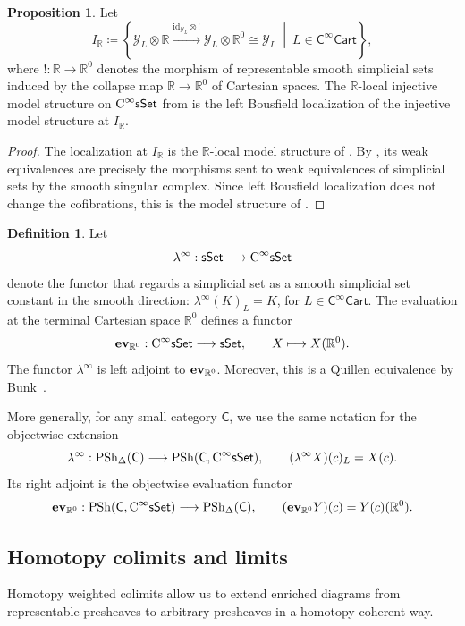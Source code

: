 \documentclass{amsart}
\newcommand{\cat}[1]{\mathsf{#1}}
\newcommand{\sset}{\cat{sSet}}
\newcommand{\id}{\mathrm{id}}
\newcommand{\CsSet}{\textnormal{C}^{\infty}\sset}
\newcommand{\Cart}{\cat{C}^{\infty}\cat{Cart}}
\renewcommand{\ev}{\textnormal{\textbf{ev}}}
\newcommand{\psh}{\mathrm{PSh}}
\newcommand{\spsh}{\mathrm{PSh}_{\Delta}}
\newcommand{\ra}{\rightarrow}
\newcommand{\RR}{{\mathbb{R}}}
\newcommand{\Yo}{\mathscr{Y}}
\theoremstyle{definition}
\newtheorem{definition}[equation]{Definition}
\newtheorem{proposition}[equation]{Proposition}
\numberwithin{equation}{subsection}
\numberwithin{subsubsection}{subsection}
\begin{document}
\begin{proposition}\label{prop:smooth.model.as.localization}
  Let
  \[
    I_{\RR}
    \coloneqq
    \left\{
      \Yo_L\otimes\RR
      \xrightarrow{\id_{\Yo_L}\otimes {!}}
      \Yo_L\otimes\RR^0
      \cong\Yo_L
      \ \middle|\ L\in\Cart
    \right\},
  \]
  where \({!}:\RR\ra\RR^0\) denotes the morphism of representable smooth
  simplicial sets induced by the collapse map \(\RR \ra \RR^0\) of Cartesian
  spaces.
  The \(\RR\)-local injective model structure on \(\CsSet\) from
   is the left
  Bousfield localization of the injective model structure at
  \(I_{\RR}\).
\end{proposition}

\begin{proof}
  The localization at \(I_{\RR}\) is the \(\RR\)-local model structure
  of \cite[Definition~2.5]{Bun22}. By
  \cite[Theorem~5.7]{Bun22}, its weak equivalences are precisely the
  morphisms sent to weak equivalences of simplicial sets by the smooth
  singular complex. Since left Bousfield localization does not change
  the cofibrations, this is the model structure of
  .
\end{proof}

\begin{definition}\label{def:constant.smooth.direction}
  Let
  \[
    \lambda^\infty:\sset\longrightarrow \CsSet
  \]
  denote the functor that regards a simplicial set as a smooth simplicial
  set constant in the smooth direction: \( \lambda^\infty(K)_L=K \), for
  \(L\in\Cart\).
  The evaluation at the terminal Cartesian space \( \RR^0 \) defines a functor
  \[
    \ev_{\RR^0}:\CsSet\longrightarrow\sset,
    \qquad
    X\longmapsto X(\RR^0).
  \]
  The functor \( \lambda^\infty \) is left adjoint to
  \( \ev_{\RR^0} \). Moreover, this is a Quillen equivalence by
  Bunk~\cite[Lemma~2.17]{Bun22}.

  More generally, for any small category \( \cat{C} \), we use the same
  notation for the objectwise extension
  \[
    \lambda^\infty:
    \spsh(\cat{C})
    \longrightarrow
    \psh(\cat{C},\CsSet),
    \qquad
    (\lambda^\infty X)(c)_L=X(c).
  \]
  Its right adjoint is the objectwise evaluation functor
  \[
    \ev_{\RR^0}:
    \psh(\cat{C},\CsSet)
    \longrightarrow
    \spsh(\cat{C}),
    \qquad
    (\ev_{\RR^0}Y)(c)=Y(c)(\RR^0).
  \]
\end{definition}

\subsection{Homotopy colimits and limits}\label{subsec:homotopy.colimits}
Homotopy weighted colimits allow us to extend enriched diagrams from
representable presheaves to arbitrary presheaves in a homotopy-coherent way.
\end{document}
